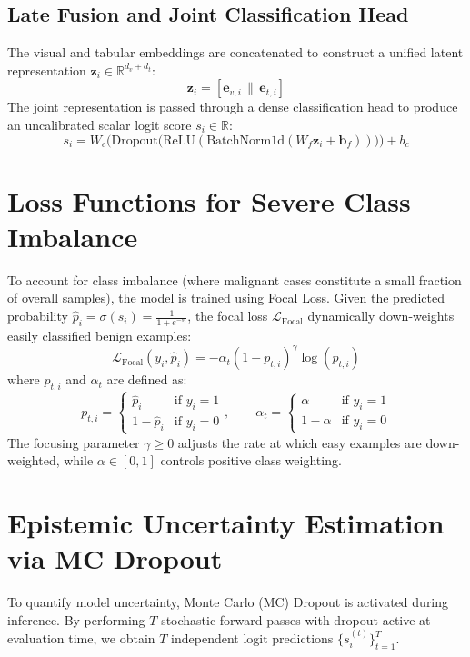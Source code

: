 \documentclass[12pt,a4paper]{report}
\begin{document}
	\subsection{Late Fusion and Joint Classification Head}
	The visual and tabular embeddings are concatenated to construct a unified latent representation $\mathbf{z}_i \in \mathbb{R}^{d_v + d_t}$:
	\begin{equation}
		\mathbf{z}_i = \left[ \mathbf{e}_{v, i} \,\|\, \mathbf{e}_{t, i} \right]
	\end{equation}
	The joint representation is passed through a dense classification head to produce an uncalibrated scalar logit score $s_i \in \mathbb{R}$:
	\begin{equation}
		s_i = W_c \Big( \text{Dropout}\big(\text{ReLU}(\text{BatchNorm1d}(W_f \mathbf{z}_i + \mathbf{b}_f))\big) \Big) + b_c
	\end{equation}
	
	\section{Loss Functions for Severe Class Imbalance}
	To account for class imbalance (where malignant cases constitute a small fraction of overall samples), the model is trained using Focal Loss. Given the predicted probability $\hat{p}_i = \sigma(s_i) = \frac{1}{1 + e^{-s_i}}$, the focal loss $\mathcal{L}_{\text{Focal}}$ dynamically down-weights easily classified benign examples:
	\begin{equation}
		\mathcal{L}_{\text{Focal}}(y_i, \hat{p}_i) = -\alpha_t (1 - p_{t, i})^\gamma \log(p_{t, i})
	\end{equation}
	where $p_{t, i}$ and $\alpha_t$ are defined as:
	\begin{equation}
		p_{t, i} = \begin{cases} \hat{p}_i & \text{if } y_i = 1 \\ 1 - \hat{p}_i & \text{if } y_i = 0 \end{cases}, \qquad
		\alpha_t = \begin{cases} \alpha & \text{if } y_i = 1 \\ 1 - \alpha & \text{if } y_i = 0 \end{cases}
	\end{equation}
	The focusing parameter $\gamma \ge 0$ adjusts the rate at which easy examples are down-weighted, while $\alpha \in [0, 1]$ controls positive class weighting.
	
	\section{Epistemic Uncertainty Estimation via MC Dropout}
	To quantify model uncertainty, Monte Carlo (MC) Dropout is activated during inference. By performing $T$ stochastic forward passes with dropout active at evaluation time, we obtain $T$ independent logit predictions $\{s_i^{(t)}\}_{t=1}^T$.
	
\end{document}

